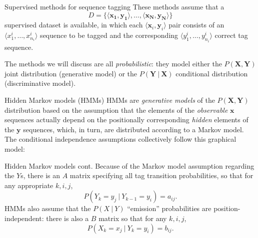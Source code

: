 \documentclass[style=upen, size=14pt]{powerdot}
\newcommand{\gold}{\color{arany}}
\theoremstyle{definition}
\begin{document}
  \begin{slide}[toc=Supervised methods]{Supervised methods for sequence tagging}
    These methods assume that a
    $$D=\{\langle \mathbf{x_1},\mathbf{y_1} \rangle,\dots, \langle \mathbf{x_N},\mathbf{y_N} \rangle\}$$
    supervised dataset is available, in which each
    $\langle \mathbf{x}_i, \mathbf{y}_i \rangle$ pair consists of an
    $\langle x_1^i,\dots,x_{n_i}^i\rangle$ sequence to be tagged and the
    corresponding $\langle y_1^i,\dots,y_{n_i}^i\rangle$ correct tag sequence.\bigskip

    The methods we will discuss are all \emph{probabilistic}: they model either
    the $ P(\mathbf{X}, \mathbf{Y}) $ joint distribution (generative model) or
    the $ P(\mathbf{Y}~|~\mathbf{X}) $ conditional distribution (discriminative
    model).
  \end{slide}

  \begin{slide}[toc=HMMs]{Hidden Markov models (HMMs)}
    HMMs are \emph{generative models} of the $P(\mathbf{X}, \mathbf{Y})$
    distribution based on the assumption that the elements of the \emph{\gold
      observable} $\mathbf{x}$ sequences actually depend on the positionally
    corresponding \emph{\gold hidden} elements of the $\mathbf{y}$ sequences,
    which, in turn, are distributed according to a Markov model. The conditional
    independence assumptions collectively follow this graphical model:
    \begin{center}
    \end{center}
  \end{slide}

  \begin{slide}[toc=]{Hidden Markov models cont.}
    Because of the Markov model assumption regarding the $Y$s, there is an
    $A$ matrix specifying all tag
    transition probabilities, so that for any appropriate $k, i, j$,
    $$
    P(Y_k=y_j ~|~Y_{k-1}=y_i) = a_{i j}.
    $$
    HMMs also assume that the $P(X~|~Y)$ ``emission'' probabilities are
    position-independent: there is also a $B$ matrix so that for any
    $k, i, j$,
    $$
    P(X_k= x_j ~|~Y_{k}= y_i) = b_{i j}.
    $$
  \end{slide}
\end{document}
